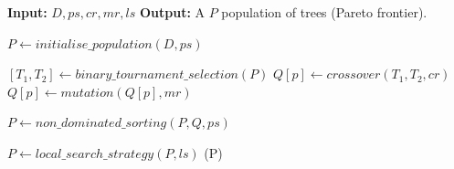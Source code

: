 \begin{algorithm}
	\caption{MO memetic algorithm (MO-MA) \citep{VillalobosCid2019}}
	\label{alg:memetic}
	\begin{algorithmic}[1]
		\fontsize{12}{12}\selectfont

		\State \textbf{Input:} $D,ps,cr,mr,ls$
		\State \textbf{Output:} A $P$ population of trees (Pareto frontier).

		\;
		\State $P \gets initialise\_population(D,ps)$




		\;
		\State  $[T_1,T_2]  \gets binary\_tournament\_selection(P)$
		\State  $Q[p] \gets crossover(T_1,T_2,cr)$
		\State $Q[p] \gets mutation(Q[p],mr)$
		\EndFor

		\;
		\State $P \gets non\_dominated\_sorting(P,Q,ps)$

		\;
		\State $P \gets local\_search\_strategy(P,ls)$
		\EndWhile
		\State \Return (P)
	\end{algorithmic}
\end{algorithm}